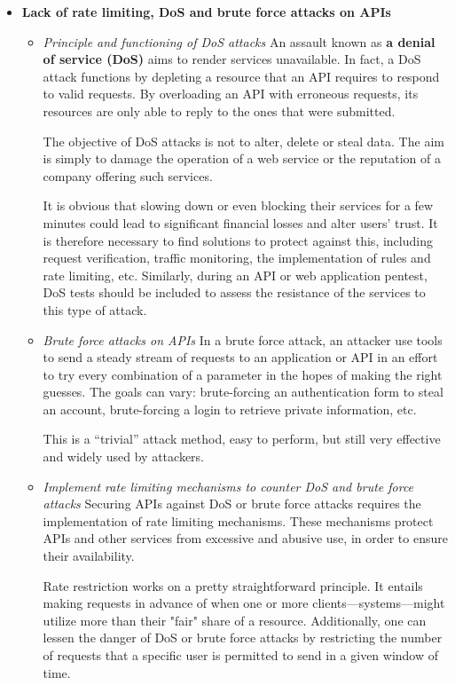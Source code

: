 \begin{itemize}
    \item \textbf{Lack of rate limiting, DoS and brute force attacks on APIs}
    \begin{itemize}
        \item \textit{Principle and functioning of DoS attacks}
        \newline
        An assault known as \textbf{a denial of service (DoS)} aims to render services unavailable. In fact, a DoS attack functions by depleting a resource that an API requires to respond to valid requests. By overloading an API with erroneous requests, its resources are only able to reply to the ones that were submitted.

        The objective of DoS attacks is not to alter, delete or steal data. The aim is simply to damage the operation of a web service or the reputation of a company offering such services.

        It is obvious that slowing down or even blocking their services for a few minutes could lead to significant financial losses and alter users’ trust. It is therefore necessary to find solutions to protect against this, including request verification, traffic monitoring, the implementation of rules and rate limiting, etc. Similarly, during an API or web application pentest, DoS tests should be included to assess the resistance of the services to this type of attack.
        \item \textit{Brute force attacks on APIs}
        \newline
        In a brute force attack, an attacker use tools to send a steady stream of requests to an application or API in an effort to try every combination of a parameter in the hopes of making the right guesses. The goals can vary: brute-forcing an authentication form to steal an account, brute-forcing a login to retrieve private information, etc.

        This is a “trivial” attack method, easy to perform, but still very effective and widely used by attackers.
        \item \textit{Implement rate limiting mechanisms to counter DoS and brute force attacks}
        \newline
        Securing APIs against DoS or brute force attacks requires the implementation of rate limiting mechanisms. These mechanisms protect APIs and other services from excessive and abusive use, in order to ensure their availability.

        Rate restriction works on a pretty straightforward principle. It entails making requests in advance of when one or more clients—systems—might utilize more than their "fair" share of a resource. Additionally, one can lessen the danger of DoS or brute force attacks by restricting the number of requests that a specific user is permitted to send in a given window of time.


\end{itemize}
\end{itemize}
